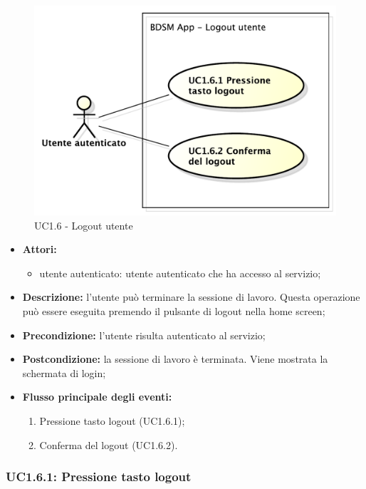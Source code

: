 \begin{figure}[htbp]
	\centering
	\centerline{\includegraphics[scale=0.45]{./images/UC1_6.pdf}}
	\caption{UC1.6 - Logout utente}
\end{figure}

\begin{itemize}
	\item \textbf{Attori:}
	\begin{itemize}
		\item utente autenticato: utente autenticato che ha accesso al servizio;
	\end{itemize}
	\item \textbf{Descrizione:} l'utente può terminare la sessione di lavoro. Questa operazione può essere eseguita premendo il pulsante di logout nella home screen;
	\item \textbf{Precondizione:} l'utente risulta autenticato al servizio;
	\item \textbf{Postcondizione:} la sessione di lavoro è terminata. Viene mostrata la schermata di login;
	\item \textbf{Flusso principale degli eventi:}
	\begin{enumerate}
		\item Pressione tasto logout (UC1.6.1);
		\item Conferma del logout (UC1.6.2).
	\end{enumerate}
\end{itemize}

\subsubsection{UC1.6.1: Pressione tasto logout}

